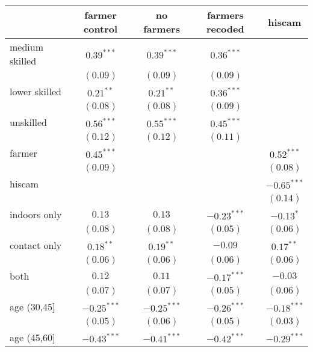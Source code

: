 
\begin{table}[h!]
\begin{center}
\begin{tabular}{l c c c c}
\hline
 & farmer control & no farmers & farmers recoded & hiscam \\
\hline
medium skilled & $0.39^{***}$  & $0.39^{***}$  & $0.36^{***}$  &               \\
               & $(0.09)$      & $(0.09)$      & $(0.09)$      &               \\
lower skilled  & $0.21^{**}$   & $0.21^{**}$   & $0.36^{***}$  &               \\
               & $(0.08)$      & $(0.08)$      & $(0.09)$      &               \\
unskilled      & $0.56^{***}$  & $0.55^{***}$  & $0.45^{***}$  &               \\
               & $(0.12)$      & $(0.12)$      & $(0.11)$      &               \\
farmer         & $0.45^{***}$  &               &               & $0.52^{***}$  \\
               & $(0.09)$      &               &               & $(0.08)$      \\
hiscam         &               &               &               & $-0.65^{***}$ \\
               &               &               &               & $(0.14)$      \\
indoors only   & $0.13$        & $0.13$        & $-0.23^{***}$ & $-0.13^{*}$   \\
               & $(0.08)$      & $(0.08)$      & $(0.05)$      & $(0.06)$      \\
contact only   & $0.18^{**}$   & $0.19^{**}$   & $-0.09$       & $0.17^{**}$   \\
               & $(0.06)$      & $(0.06)$      & $(0.06)$      & $(0.06)$      \\
both           & $0.12$        & $0.11$        & $-0.17^{***}$ & $-0.03$       \\
               & $(0.07)$      & $(0.07)$      & $(0.05)$      & $(0.06)$      \\
age (30,45]    & $-0.25^{***}$ & $-0.25^{***}$ & $-0.26^{***}$ & $-0.18^{***}$ \\
               & $(0.05)$      & $(0.06)$      & $(0.05)$      & $(0.03)$      \\
age (45,60]    & $-0.43^{***}$ & $-0.41^{***}$ & $-0.42^{***}$ & $-0.29^{***}$ \\

\end{tabular}
\end{center}
\end{table}
